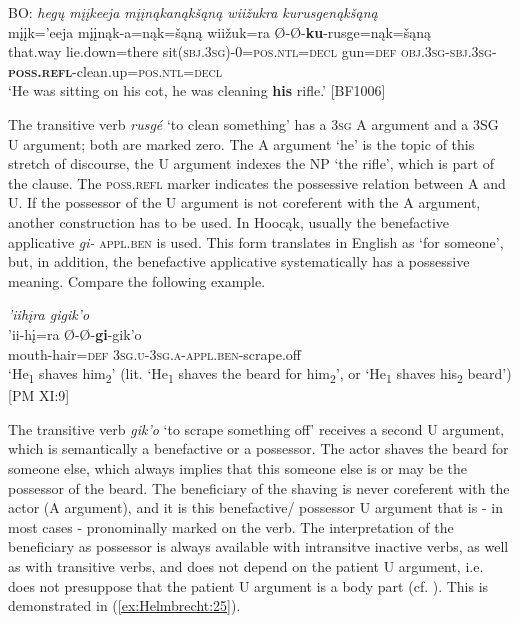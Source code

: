 \documentclass[output=paper]{langscibook}
\begin{document}
\ea \label{ex:Helmbrecht:23}  
 BO:  \textit{ hegų mįįkeeja mįįnąkanąkšąną wiižukra kurusgenąkšąną }\\
 	  {mįįk='eeja}  {mįįnąk-a=nąk=šąną}  {wiižuk=ra} {Ø-Ø-\textbf{ku}{}-rusge=nąk=šąną}\\
  {that.way}  {lie.down=there} {sit(\textsc{sbj.3sg})-0=\textsc{pos.ntl=decl}}	{gun=\textsc{def}}  {\textsc{obj.3sg-sbj.3sg}-\textbf{\textsc{poss.\textsc{refl}}}{}-clean.up=\textsc{pos.ntl=decl}}\\
  \glt `He was sitting on his cot, he was cleaning \textbf{his} rifle.' [BF1006]
\z 

The transitive verb \textit{rusgé} `to clean something' has a 3\textsc{sg} A argument and a 3SG U argument; both are marked zero. The A argument `he' is the topic of this stretch of discourse, the U argument indexes the NP `the rifle', which is part of the clause. The \textsc{poss.refl} marker indicates the possessive relation between A and U. If the possessor of the U argument is not coreferent with the A argument, another construction has to be used. In Hoocąk, usually the benefactive applicative \textit{gi-} \textsc{appl.ben} is used. This form translates in English as `for someone', but, in addition, the benefactive applicative systematically has a possessive meaning. Compare the following example.



\ea \label{ex:Helmbrecht:24} \textit{ 'iihįra gigik'o }\\
	\gll 'ii-hį=ra Ø-Ø-\textbf{gi}-gik'o\\
  mouth-hair=\textsc{def}   \textsc{3sg.u-3sg.a-appl.ben}-scrape.off\\
   \glt `He\textsubscript{1} shaves him\textsubscript{2}' (lit. `He\textsubscript{1} shaves the beard for him\textsubscript{2}{}', or `He\textsubscript{1} shaves his\textsubscript{2} beard') [PM XI:9]
\z 

The transitive verb \textit{gik'o} `to scrape something off' receives a second U argument, which is semantically a benefactive or a possessor. The actor shaves the beard for someone else, which always implies that this someone else is or may be the possessor of the beard. The beneficiary of the shaving is never coreferent with the actor (A argument), and it is this benefactive/ possessor U argument that is - in most cases - pronominally marked on the verb. The interpretation of the beneficiary as possessor is always available with intransitve inactive verbs, as well as with transitive verbs, and does not depend on the patient U argument, i.e. does not presuppose that the patient U argument is a body part (cf. \citealt{helmbrecht2003possession,Helmbrecht2021}). This is demonstrated in (\ref{ex:Helmbrecht:25}).
\end{document}
